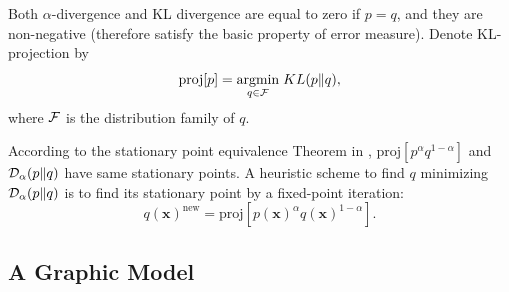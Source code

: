 \documentclass[conference]{IEEEtran}
\begin{document}
Both $\alpha$-divergence and KL divergence are equal to zero if $p=q$, and they are non-negative (therefore satisfy the basic property of error measure).
Denote KL-projection by
\begin{equation}
  \text{proj}[p] = \underset{q \in \mathcal{F}}{\operatorname{argmin}}\; KL(p\|q),
\end{equation}
where $\mathcal{F}$ is the distribution family of $q$.

According to the stationary point equivalence Theorem in \cite{divergence-measures-and-message-passing}, $\text{proj}[p^{\alpha}q^{1- \alpha}]$ and $\mathcal{D}_{\alpha}(p\|q)$ have same stationary points. A heuristic scheme to find $q$ minimizing $\mathcal{D}_{\alpha}(p\|q)$ is to find its stationary point by a fixed-point iteration:
\begin{equation}\label{eq:fixed-point-iter}
  q(\bm{x})^{\text{new}}  = \text{proj}[p(\bm{x})^{\alpha}q(\bm{x})^{1-\alpha}].
\end{equation}

\subsection{A Graphic Model}
\end{document}

